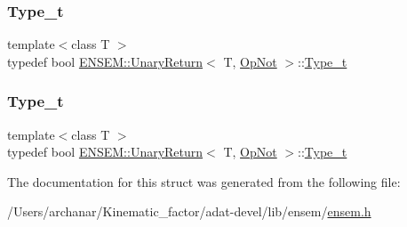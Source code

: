 \mbox{\label{structENSEM_1_1UnaryReturn_3_01T_00_01OpNot_01_4_ac8f0fccccf6b1d70cd924f95199cf9b4}} 
\subsubsection{\texorpdfstring{Type\_t}{Type\_t}\hspace{0.1cm}{\footnotesize\ttfamily [2/3]}}
{\footnotesize\ttfamily template$<$class T $>$ \\
typedef bool \mbox{\hyperlink{structENSEM_1_1UnaryReturn}{E\+N\+S\+E\+M\+::\+Unary\+Return}}$<$ T, \mbox{\hyperlink{structENSEM_1_1OpNot}{Op\+Not}} $>$\+::\mbox{\hyperlink{structENSEM_1_1UnaryReturn_3_01T_00_01OpNot_01_4_ac8f0fccccf6b1d70cd924f95199cf9b4}{Type\+\_\+t}}}

\mbox{\label{structENSEM_1_1UnaryReturn_3_01T_00_01OpNot_01_4_ac8f0fccccf6b1d70cd924f95199cf9b4}} 
\subsubsection{\texorpdfstring{Type\_t}{Type\_t}\hspace{0.1cm}{\footnotesize\ttfamily [3/3]}}
{\footnotesize\ttfamily template$<$class T $>$ \\
typedef bool \mbox{\hyperlink{structENSEM_1_1UnaryReturn}{E\+N\+S\+E\+M\+::\+Unary\+Return}}$<$ T, \mbox{\hyperlink{structENSEM_1_1OpNot}{Op\+Not}} $>$\+::\mbox{\hyperlink{structENSEM_1_1UnaryReturn_3_01T_00_01OpNot_01_4_ac8f0fccccf6b1d70cd924f95199cf9b4}{Type\+\_\+t}}}



The documentation for this struct was generated from the following file\+:\begin{DoxyCompactItemize}
\item 
/\+Users/archanar/\+Kinematic\+\_\+factor/adat-\/devel/lib/ensem/\mbox{\hyperlink{adat-devel_2lib_2ensem_2ensem_8h}{ensem.\+h}}\end{DoxyCompactItemize}
